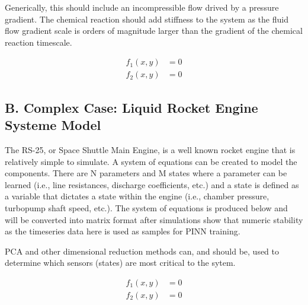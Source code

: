 \documentclass[11pt,letterpaper]{article}
\begin{document}
Generically, this should include an incompressible flow drived by a pressure gradient. The chemical reaction should add stiffness to the system as the fluid flow gradient scale is orders of magnitude larger than the gradient of the chemical reaction timescale.

\begin{align}
f_1(x, y) &= 0 \\
f_2(x, y) &= 0
\end{align}


\subsection*{B. Complex Case: Liquid Rocket Engine Systeme Model}

The RS-25, or Space Shuttle Main Engine, is a well known rocket engine that is relatively simple to simulate. A system of equations can be created to model the components. There are N parameters and M states where a parameter can be learned (i.e., line resistances, discharge coefficients, etc.) and a state is defined as a variable that dictates a state within the engine (i.e., chamber pressure, turbopump shaft speed, etc.). The system of equations is produced below and will be converted into matrix format after simulations show that numeric stability as the timeseries data here is used as samples for PINN training.

PCA and other dimensional reduction methods can, and should be, used to determine which sensors (states) are most critical to the sytem.

\begin{align}
f_1(x, y) &= 0 \\
f_2(x, y) &= 0
\end{align}
\end{document}
